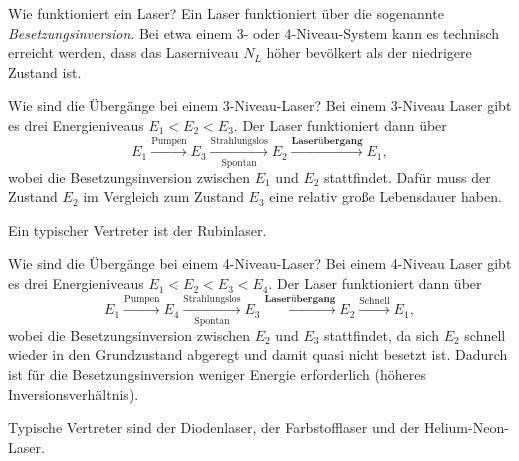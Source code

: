 \begin{fquestion}{Wie funktioniert ein Laser?}
    Ein Laser funktioniert über die sogenannte \textit{Besetzungsinversion}. 
    Bei etwa einem 3- oder 4-Niveau-System kann es technisch erreicht werden, dass das Laserniveau $N_L$ höher bevölkert als der niedrigere Zustand ist.
\end{fquestion}

\begin{fquestion}{Wie sind die Übergänge bei einem 3-Niveau-Laser?}
    Bei einem 3-Niveau Laser gibt es drei Energieniveaus $E_1 < E_2 < E_3$. 
    Der Laser funktioniert dann über
    $$E_1 \xrightarrow{\text{Pumpen}} E_3 \xrightarrow[\text{Spontan}]{\text{Strahlungslos}} E_2 \xrightarrow{\textbf{Laserübergang}} E_1,$$
    wobei die Besetzungsinversion zwischen $E_1$ und $E_2$ stattfindet.
    Dafür muss der Zustand $E_2$ im Vergleich zum Zustand $E_3$ eine relativ große Lebensdauer haben.
    
    Ein typischer Vertreter ist der Rubinlaser.
\end{fquestion}

\begin{fquestion}{Wie sind die Übergänge bei einem 4-Niveau-Laser?}
    Bei einem 4-Niveau Laser gibt es drei Energieniveaus $E_1 < E_2 < E_3 < E_4$. 
    Der Laser funktioniert dann über
    $$E_1 \xrightarrow{\text{Pumpen}} E_4 \xrightarrow[\text{Spontan}]{\text{Strahlungslos}} E_3 \xrightarrow{\textbf{Laserübergang}} E_2 \xrightarrow{\text{Schnell}} E_1,$$
    wobei die Besetzungsinversion zwischen $E_2$ und $E_3$ stattfindet, da sich $E_2$ schnell wieder in den Grundzustand abgeregt und damit quasi nicht besetzt ist.
    Dadurch ist für die Besetzungsinversion weniger Energie erforderlich (höheres Inversionsverhältnis).
    
    Typische Vertreter sind der Diodenlaser, der Farbstofflaser und der Helium-Neon-Laser.
\end{fquestion}




